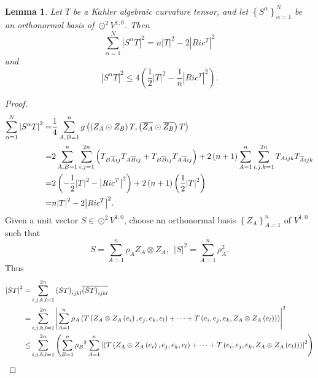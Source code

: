 \documentclass{amsart}
\newtheorem{lemma}[theorem]{Lemma}
\theoremstyle{definition}
\theoremstyle{remark}
\numberwithin{equation}{section}
\begin{document}
\begin{lemma}
\label{lemma4.3}
Let $T$ be a K$\ddot a$hler algebraic curvature tensor, and let $\left\{ {{S^\alpha }} \right\}_{\alpha  = 1}^N$ be an orthonormal basis of ${ \odot ^2}{V^{1,0}}$. Then
 $$ \sum\limits_{\alpha  = 1}^N {{{\left| {{S^\alpha }T} \right|}^2}}=n{\left| T \right|^2} - 2{\left| {Ric^T} \right|^2} $$
and
$${\left| {S^{\alpha}T} \right|^2} \le 4\left( {\frac{1}{2}{{\left| T \right|}^2} - \frac{1}{n}{{\left| {Ri{c^T}} \right|}^2}} \right). $$
\end{lemma}
\begin{proof}
\begin{align*}
  \sum\limits_{\alpha  = 1}^N {{{\left| {{S^\alpha }T} \right|}^2}}  =& \frac{1}{4}\sum\limits_{A,B = 1}^n {g\left( {\left( {{Z_A} \odot {Z_B}} \right)T,\left( {\overline {{Z_A}}  \odot \overline {{Z_B}} } \right)T} \right)}  \hfill \\
   =& 2\sum\limits_{A,B = 1}^n {\sum\limits_{i,j = 1}^{2n} {\left( {{T_{B\overline A ij}}{T_{A\overline B ij}} + {T_{B\overline B ij}}{T_{A\overline A ij}}} \right)} }  + 2\left( {n + 1} \right)\sum\limits_{A = 1}^n {\sum\limits_{i,j,k = 1}^{2n} {{T_{Aijk}}{T_{\overline A ijk}}} }  \hfill \\
   =& 2\left( { - \frac{1}{2}{{\left| T \right|}^2} - {{\left| {Ric^T } \right|}^2}} \right) + 2\left( {n + 1} \right)\left( {\frac{1}{2}{{\left| T \right|}^2}} \right) \hfill \\
   =& n{\left| T \right|^2} - 2{\left| {Ric^T} \right|^2} .
\end{align*}
Given a unit vector $S \in { \odot ^2}{V^{1,0}}$, choose an orthonormal basis $\left\{ {{Z_A}} \right\}_{A = 1}^n$ of $V^{1,0}$ such that
$$S = \sum\limits_{A = 1}^n {{\rho _A}{Z_A} \otimes {Z_A}},\ \ {\left| S \right|^2} = \sum\limits_{A = 1}^n {\rho _A^2}.$$ Thus
\begin{align*}
  {\left| {ST} \right|^2} =& \sum\limits_{i,j,k,l = 1}^{2n} {{{\left( {ST} \right)}_{ijkl}}\overline {{{\left( {ST} \right)}_{ijkl}}} }  \hfill \\
   =& \sum\limits_{i,j,k,l = 1}^{2n} {{{\left| {\sum\limits_{A = 1}^n {{\rho _A}\left( {T\left( {{Z_A} \otimes {Z_A}\left( {{e_i}} \right),{e_j},{e_k},{e_l}} \right) +  \cdots  + T\left( {{e_i},{e_j},{e_k},{Z_A} \otimes {Z_A}\left( {{e_l}} \right)} \right)} \right)} } \right|}^2}}  \hfill \\
   \le& \sum\limits_{i,j,k,l = 1}^{2n} {\left( {\sum\limits_{B = 1}^n {{\rho _B}^2} \sum\limits_{A = 1}^n {{{\left| {\left( {T\left( {{Z_A} \otimes {Z_A}\left( {{e_i}} \right),{e_j},{e_k},{e_l}} \right) +  \cdots  + T\left( {{e_i},{e_j},{e_k},{Z_A} \otimes {Z_A}\left( {{e_l}} \right)} \right)} \right)} \right|}^2}} } \right)}  \hfill \\

\end{align*}
\end{proof}
\end{document}

